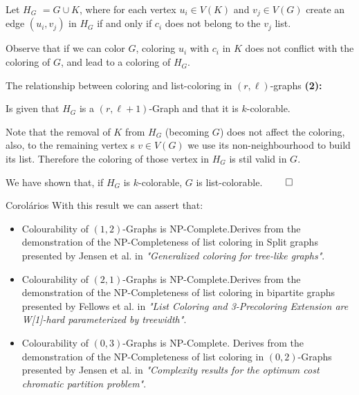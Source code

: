 \documentclass[9pt, compress]{beamer}
\newcommand{\?}{\textcolor{warn}{\textit{?}}}
\begin{document}
    \begin{frame}  
      Let $H_G$ $= G \cup K$, where for each vertex $u_i \in V(K)$ and $v_j \in V(G)$ create an edge $(u_i,v_j) $ in $H_G$ if and only if $c_i$ does not belong to the $v_j$ list.
      \begin{center}
        \begin{figure}
        
      \end{figure}
      \end{center}   
      Observe that if we can color $G$, coloring $u_i$ with $c_i$ in $K$ does not conflict with the coloring of $G$, and lead to a coloring of $H_G$. 
    \end{frame}
    \begin{frame}{The relationship between coloring and list-coloring in $(r,\ell)$-graphs}
      \textbf{(2):}
      
      Is given that $H_G$ is a $(r,\ell+1)$-Graph and that it is $k$-colorable.
      
      Note that the removal of $K$ from $H_G$ (becoming $G$) does not affect the coloring, also, to the remaining vertex s $v \in V(G)$ we use its non-neighbourhood to build its list.
      Therefore the coloring of those vertex in $H_G$ is stil valid in $G$.
      
      We have shown that, if $H_G$ is $k$-colorable, $G$ is list-colorable.
      $\qed$
    \end{frame}
    \begin{frame}{Corolários}
      With this result we can assert that:
      \begin{itemize}
        \item Colourability of $(1,2)$-Graphs is NP-Complete.\newline Derives from the demonstration of the NP-Completeness of list coloring in Split graphs presented by Jensen et al. in \textit{"Generalized coloring for tree-like graphs"}.
        \item Colourability of $(2,1)$-Graphs is NP-Complete.\newline Derives from the demonstration of the NP-Completeness of list coloring in bipartite graphs presented by Fellows et al. in \textit{"List Coloring and 3-Precoloring Extension are W[1]-hard parameterized by treewidth"}.
        \item Colourability of $(0,3)$-Graphs is NP-Complete.
        \newline Derives from the demonstration of the NP-Completeness of list coloring in $(0,2)$-Graphs presented by Jensen et al. in \textit{"Complexity results for the optimum cost chromatic partition problem"}.
      \end{itemize}
    \end{frame}
\end{document}
